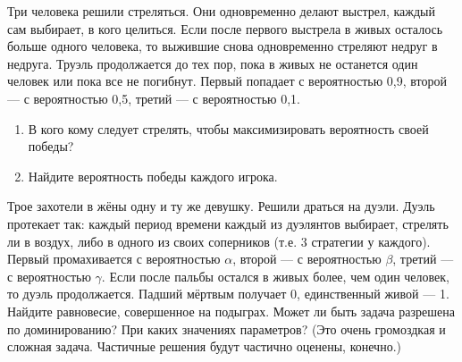 \begin{problem}[Труэль][T] 
Три человека решили стреляться. Они одновременно делают выстрел, каждый сам выбирает, в кого целиться. Если после первого выстрела в живых осталось больше одного человека, то выжившие снова одновременно стреляют недруг в недруга. Труэль продолжается до тех пор, пока в живых не останется один человек или пока все не погибнут. Первый попадает с вероятностью 0,9, второй  --- с вероятностью 0,5, третий --- с вероятностью 0,1.\par
\begin{enumerate}
\item  В кого кому следует стрелять, чтобы максимизировать вероятность своей победы?\par
\item Найдите вероятность победы каждого игрока.\par

\end{enumerate}


\begin{sol}

\end{sol}
\end{problem}


\begin{problem}[Дуэль.] 
\begin{source}
\cite{savva:nmu}
\end{source}
Трое захотели в жёны одну и ту же девушку. Решили драться на дуэли. Дуэль протекает так: каждый период времени каждый из дуэлянтов выбирает, стрелять ли в воздух, либо в одного из своих соперников (т.е. 3 стратегии у каждого). Первый промахивается с вероятностью $\alpha$, второй --- с вероятностью $\beta$, третий --- с вероятностью $\gamma$. Если после пальбы остался в живых более, чем один человек, то дуэль продолжается. Падший мёртвым получает 0, единственный живой --- 1. Найдите равновесие, совершенное на подыграх. Может ли быть задача разрешена по доминированию? При каких значениях параметров? (Это очень громоздкая и сложная задача. Частичные решения будут частично оценены, конечно.)

\begin{sol}

\end{sol}
\end{problem}

